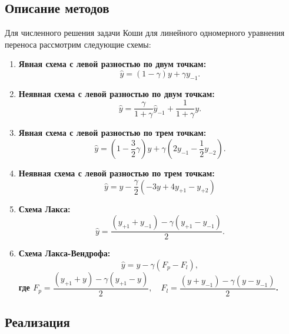 \documentclass[12pt, a4paper]{article}
\begin{document}
\subsection{Описание методов}
Для численного решения задачи Коши для линейного одномерного уравнения переноса рассмотрим следующие схемы:

\begin{enumerate}
	
	\item \bf{Явная схема с левой разностью по двум точкам}:
	\begin{equation*}
		\widehat{y} = (1 - \gamma) y + \gamma y_{-1}.
	\end{equation*}
	
	\item \bf{Неявная схема с левой разностью по двум точкам}:
	\begin{equation*}
		\widehat{y} = \dfrac{\gamma}{1 + \gamma} \widehat{y}_{-1} + \dfrac{1}{1 + \gamma} y .
	\end{equation*}
	
	\item \bf{Явная схема с левой разностью по трем точкам}:
	\begin{equation*}
		\widehat{y} = (1 - \frac{3}{2}\gamma) y + \gamma(2y_{-1} - \frac{1}{2}y_{-2}) .
	\end{equation*}
	
	\item \bf{Неявная схема с левой разностью по трем точкам}:
	\begin{equation*}
		\widehat{y} = y - \frac{\gamma}{2} (-3y + 4y_{+1} - y_{+2})
	\end{equation*}
	
	\item \bf{Схема Лакса}:
	\begin{equation*}
		\widehat{y} = \dfrac{(y_{+1} + y_{-1}) - \gamma(y_{+1} - y_{-1})}{2} .
	\end{equation*}
	
	\item \bf{Схема Лакса-Вендрофа}:
	\begin{equation*}
		\widehat{y} = y - \gamma(F_p - F_l),
	\end{equation*}
	где $ F_p = \dfrac{(y_{+1} + y) - \gamma (y_{+1} - y)}{2}, \quad F_l = \dfrac{(y + y_{-1}) - \gamma (y - y_{-1})}{2} $.
\end{enumerate}

\subsection{Реализация}
\end{document}
